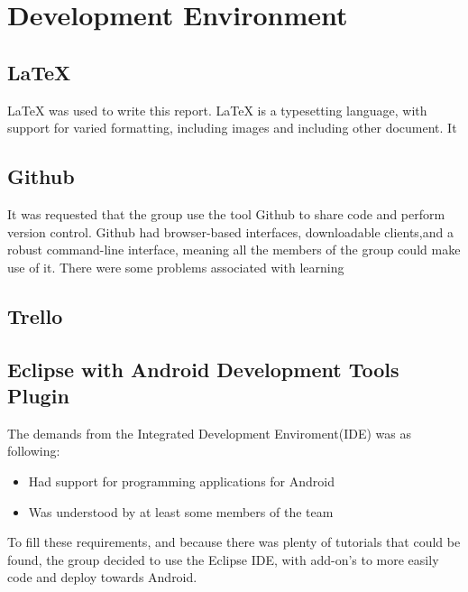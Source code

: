 \chapter{Development Environment}

\section{LaTeX}
LaTeX was used to write this report. LaTeX is a typesetting language, with support for varied formatting, including images and including other document. It
\section{Github}
It was requested that the group use the tool Github to share code and perform version control. Github had browser-based interfaces, downloadable clients,and a robust command-line interface, meaning all the members of the group could make use of it. There were some problems associated with learning
\section{Trello}

\section{Eclipse with Android Development Tools Plugin}
The demands from the Integrated Development Enviroment(IDE) was as following:
\begin{itemize}
\item Had support for programming applications for Android
\item Was understood by at least some members of the team
\end{itemize}
To fill these requirements, and because there was plenty of tutorials that could be found, the group decided to use the Eclipse IDE, with add-on's to more easily code and deploy towards Android. 


 